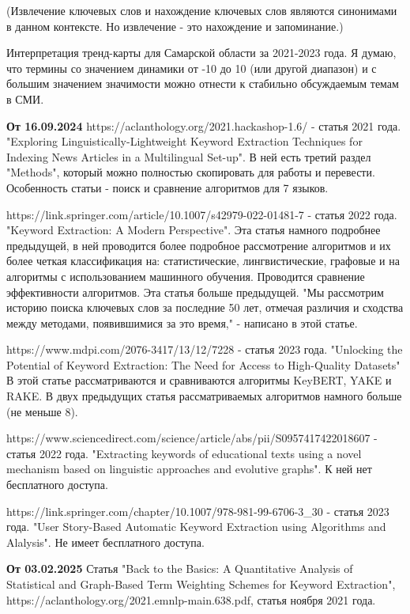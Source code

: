 \documentclass[bachelor, och, diploma ]{SCWorks}
\begin{document}
(Извлечение ключевых слов и нахождение ключевых слов являются синонимами в данном контексте. Но извлечение - это нахождение и запоминание.)



Интерпретация тренд-карты для Самарской области за 2021-2023 года.
Я думаю, что термины со значением динамики от -10 до 10 (или другой диапазон) и с большим значением значимости можно отнести к стабильно обсуждаемым темам в СМИ.

\textbf{От 16.09.2024}
https://aclanthology.org/2021.hackashop-1.6/ - статья 2021 года. 
"Exploring Linguistically-Lightweight Keyword Extraction Techniques for
Indexing News Articles in a Multilingual Set-up".
В ней есть третий раздел "Methods", который можно полностью скопировать для работы и перевести. Особенность статьи - поиск и сравнение алгоритмов для 7 языков.

https://link.springer.com/article/10.1007/s42979-022-01481-7 - статья 2022 года. "Keyword Extraction: A Modern Perspective".
Эта статья намного подробнее предыдущей, в ней проводится более подробное рассмотрение алгоритмов и их более четкая классификация на: статистические, лингвистические, графовые и на алгоритмы с использованием машинного обучения. Проводится сравнение эффективности алгоритмов. Эта статья больше предыдущей. "Мы рассмотрим историю поиска ключевых
слов за последние 50 лет, отмечая различия и сходства между методами, появившимися за это время," - написано в этой статье.

https://www.mdpi.com/2076-3417/13/12/7228 - статья 2023 года. "Unlocking the Potential of Keyword Extraction: The Need for Access to High-Quality Datasets"
В этой статье рассматриваются и сравниваются алгоритмы KeyBERT, YAKE и RAKE. В двух предыдущих статья рассматриваемых алгоритмов намного больше (не меньше 8).

https://www.sciencedirect.com/science/article/abs/pii/S0957417422018607 - статья 2022 года. 
"Extracting keywords of educational texts using a novel mechanism based on linguistic approaches and evolutive graphs".
К ней нет бесплатного доступа.

https://link.springer.com/chapter/10.1007/978-981-99-6706-3_30 - статья 2023 года. 
"User Story-Based Automatic Keyword Extraction using Algorithms and Alalysis". 
Не имеет бесплатного доступа.





\textbf{От 03.02.2025}
Статья "Back to the Basics: A Quantitative Analysis of Statistical and
Graph-Based Term Weighting Schemes for Keyword Extraction",
https://aclanthology.org/2021.emnlp-main.638.pdf, статья ноября 2021 года.
\end{document}
